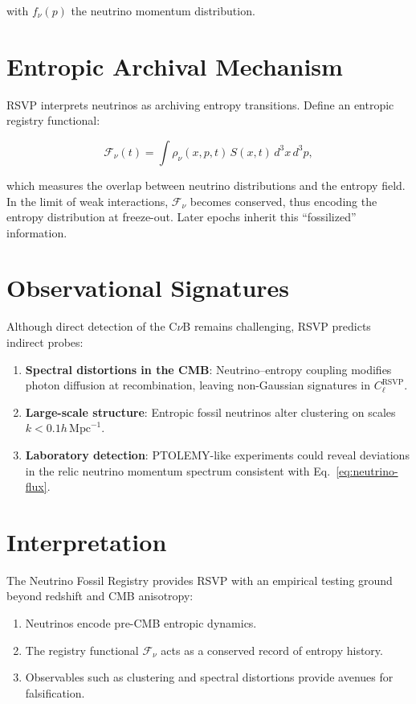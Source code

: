 \documentclass[12pt]{report}
\begin{document}
with $f_\nu(p)$ the neutrino momentum distribution.

\section{Entropic Archival Mechanism}

RSVP interprets neutrinos as archiving entropy transitions. Define an entropic registry functional:

\begin{equation}
\mathcal{F}_\nu(t) = \int \rho_\nu(x,p,t)\, S(x,t)\, d^3x\, d^3p,
\label{eq:fossil-functional}
\end{equation}

which measures the overlap between neutrino distributions and the entropy field.  
In the limit of weak interactions, $\mathcal{F}_\nu$ becomes conserved, thus encoding the entropy distribution at freeze-out. Later epochs inherit this “fossilized” information.

\section{Observational Signatures}

Although direct detection of the C$\nu$B remains challenging, RSVP predicts indirect probes:

\begin{enumerate}
    \item \textbf{Spectral distortions in the CMB}:  
    Neutrino–entropy coupling modifies photon diffusion at recombination, leaving non-Gaussian signatures in $C_\ell^{\text{RSVP}}$.
    \item \textbf{Large-scale structure}:  
    Entropic fossil neutrinos alter clustering on scales $k < 0.1 h\,\mathrm{Mpc}^{-1}$.
    \item \textbf{Laboratory detection}:  
    PTOLEMY-like experiments could reveal deviations in the relic neutrino momentum spectrum consistent with Eq.~\eqref{eq:neutrino-flux}.
\end{enumerate}

\section{Interpretation}

The Neutrino Fossil Registry provides RSVP with an empirical testing ground beyond redshift and CMB anisotropy:

\begin{enumerate}
    \item Neutrinos encode pre-CMB entropic dynamics.  
    \item The registry functional $\mathcal{F}_\nu$ acts as a conserved record of entropy history.  
    \item Observables such as clustering and spectral distortions provide avenues for falsification.
\end{enumerate}
\end{document}
